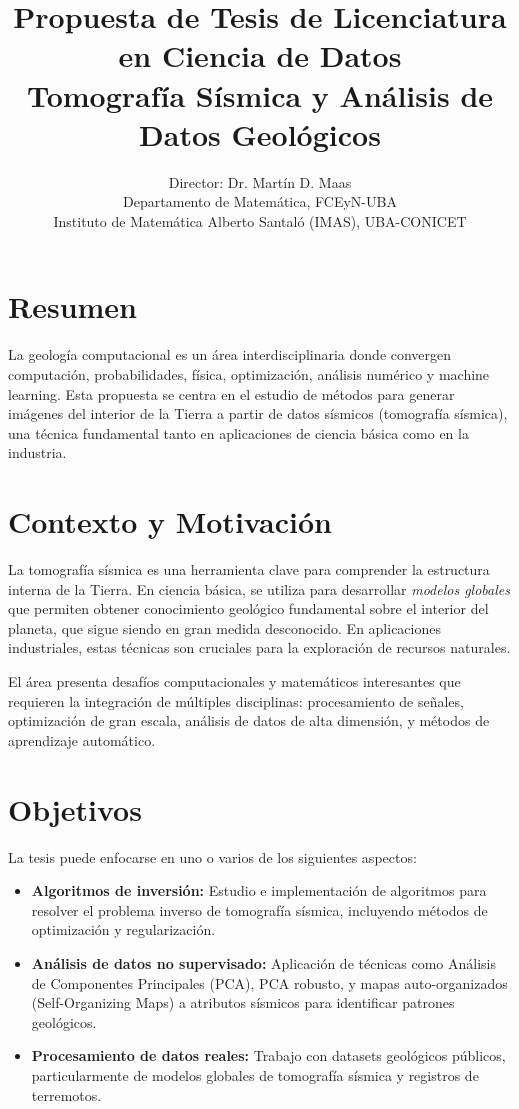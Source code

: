 \documentclass[11pt,a4paper]{article}
\title{\textbf{Propuesta de Tesis de Licenciatura en Ciencia de Datos}\\
\large Tomografía Sísmica y Análisis de Datos Geológicos}
\author{Director: Dr. Martín D. Maas\\
Departamento de Matemática, FCEyN-UBA\\
Instituto de Matemática Alberto Santaló (IMAS), UBA-CONICET}
\date{}
\begin{document}
\maketitle

\section*{Resumen}

La geología computacional es un área interdisciplinaria donde convergen computación, probabilidades, física, optimización, análisis numérico y machine learning. Esta propuesta se centra en el estudio de métodos para generar imágenes del interior de la Tierra a partir de datos sísmicos (tomografía sísmica), una técnica fundamental tanto en aplicaciones de ciencia básica como en la industria.

\section*{Contexto y Motivación}

La tomografía sísmica es una herramienta clave para comprender la estructura interna de la Tierra. En ciencia básica, se utiliza para desarrollar \emph{modelos globales} que permiten obtener conocimiento geológico fundamental sobre el interior del planeta, que sigue siendo en gran medida desconocido. En aplicaciones industriales, estas técnicas son cruciales para la exploración de recursos naturales.

El área presenta desafíos computacionales y matemáticos interesantes que requieren la integración de múltiples disciplinas: procesamiento de señales, optimización de gran escala, análisis de datos de alta dimensión, y métodos de aprendizaje automático.

\section*{Objetivos}

La tesis puede enfocarse en uno o varios de los siguientes aspectos:

\begin{itemize}[leftmargin=*]
    \item \textbf{Algoritmos de inversión:} Estudio e implementación de algoritmos para resolver el problema inverso de tomografía sísmica, incluyendo métodos de optimización y regularización.
    
    \item \textbf{Análisis de datos no supervisado:} Aplicación de técnicas como Análisis de Componentes Principales (PCA), PCA robusto, y mapas auto-organizados (Self-Organizing Maps) a atributos sísmicos para identificar patrones geológicos.
    
    \item \textbf{Procesamiento de datos reales:} Trabajo con datasets geológicos públicos, particularmente de modelos globales de tomografía sísmica y registros de terremotos.
\end{itemize}
\end{document}
